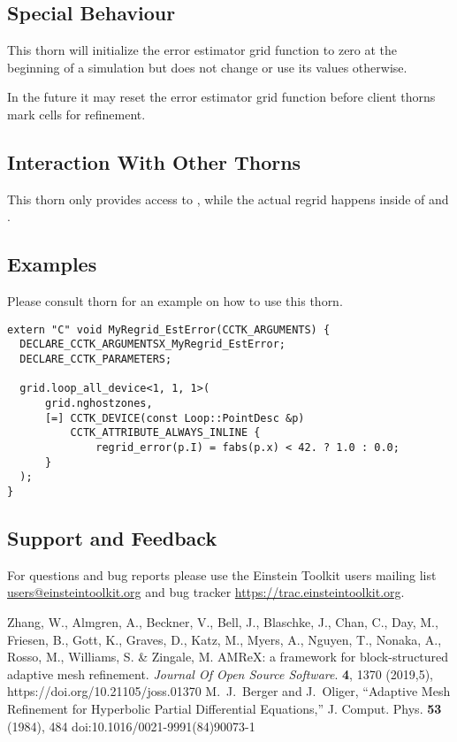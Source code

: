 \subsection{Special Behaviour}

This thorn will initialize the error estimator grid function
 to zero at the beginning of a simulation but does not
change or use its values otherwise.

In the future it may reset the error estimator grid function before client
thorns mark cells for refinement.

\subsection{Interaction With Other Thorns}

This thorn only provides access to , while the actual
regrid happens inside of  and . 

\subsection{Examples}

Please consult thorn  for an example on how to use this
thorn.

\begin{verbatim}
extern "C" void MyRegrid_EstError(CCTK_ARGUMENTS) {
  DECLARE_CCTK_ARGUMENTSX_MyRegrid_EstError;
  DECLARE_CCTK_PARAMETERS;

  grid.loop_all_device<1, 1, 1>(
      grid.nghostzones,
      [=] CCTK_DEVICE(const Loop::PointDesc &p)
          CCTK_ATTRIBUTE_ALWAYS_INLINE {
              regrid_error(p.I) = fabs(p.x) < 42. ? 1.0 : 0.0;
      }
  );
}
\end{verbatim}

\subsection{Support and Feedback}

For questions and bug reports please use the Einstein Toolkit users mailing
list \url{users@einsteintoolkit.org} and bug tracker
\url{https://trac.einsteintoolkit.org}.

\begin{thebibliography}{9}
 Zhang, W., Almgren, A., Beckner, V., Bell, J., Blaschke, J., Chan, C., Day, M., Friesen, B., Gott, K., Graves, D., Katz, M., Myers, A., Nguyen, T., Nonaka, A., Rosso, M., Williams, S. \& Zingale, M. AMReX: a framework for block-structured adaptive mesh refinement. {\em Journal Of Open Source Software}. \textbf{4}, 1370 (2019,5), https://doi.org/10.21105/joss.01370
 M.~J.~Berger and J.~Oliger, ``Adaptive Mesh Refinement for Hyperbolic Partial Differential Equations,'' J. Comput. Phys. \textbf{53} (1984), 484 doi:10.1016/0021-9991(84)90073-1
\end{thebibliography}

